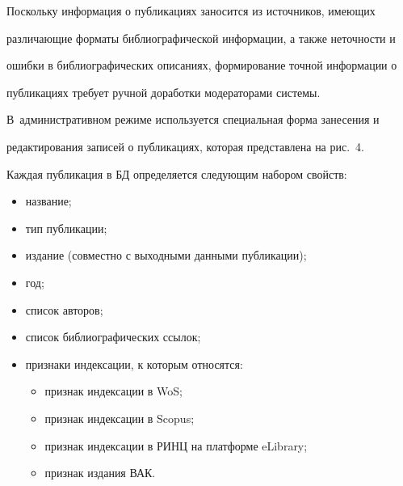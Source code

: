   Поскольку информация о публикациях заносится из источников, имеющих


различающие форматы библиографической информации, а также неточности и


ошибки в библиографических описаниях, формирование точной информации о


публикациях требует ручной доработки модераторами системы.


В~административном режиме используется специальная форма занесения и


редактирования записей о публикациях, которая представлена на рис.~4.








  Каждая публикация в БД определяется следующим набором свойств:


  \begin{itemize}


\item название;


\item тип публикации;


\item издание (совместно с выходными данными публикации);


\item год;


\item список авторов;


\item список библиографических ссылок;


\item признаки индексации, к которым относятся:


\begin{itemize}


\item признак индексации в WoS;


\item признак индексации в Scopus;


\item признак индексации в РИНЦ на платформе eLibrary;


\item признак издания ВАК.


\end{itemize}


\end{itemize}





